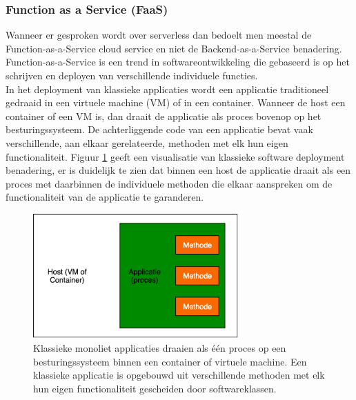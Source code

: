 \subsubsection{Function as a Service (FaaS)}
Wanneer er gesproken wordt over serverless dan bedoelt men meestal de Function-as-a-Service cloud service en niet de Backend-as-a-Service benadering.  Function-as-a-Service is een trend in softwareontwikkeling die gebaseerd is op het schrijven en deployen van verschillende individuele functies.  
\\
In het deployment van klassieke applicaties wordt een applicatie traditioneel gedraaid in een virtuele machine (VM) of in een container. Wanneer de host een container of een VM is, dan draait de applicatie als proces bovenop op het besturingssysteem. De achterliggende code van een applicatie bevat vaak verschillende, aan elkaar gerelateerde, methoden met elk hun eigen functionaliteit.  Figuur \ref{fig:traditional-software-deployment} geeft een visualisatie van klassieke software deployment benadering, er is duidelijk te zien dat binnen een host de applicatie draait als een proces met daarbinnen de individuele methoden die elkaar aanspreken om de functionaliteit van de applicatie te garanderen.
\begin{figure}
    \centering
    \includegraphics[width=0.7\textwidth]{img/traditional_software_deployment.png}
    \caption{Klassieke monoliet applicaties draaien als één proces op een besturingssysteem binnen een container of virtuele machine. Een klassieke applicatie is opgebouwd uit verschillende methoden met elk hun eigen functionaliteit gescheiden door softwareklassen.} 
    \label{fig:traditional-software-deployment}  
\end{figure}
\\
